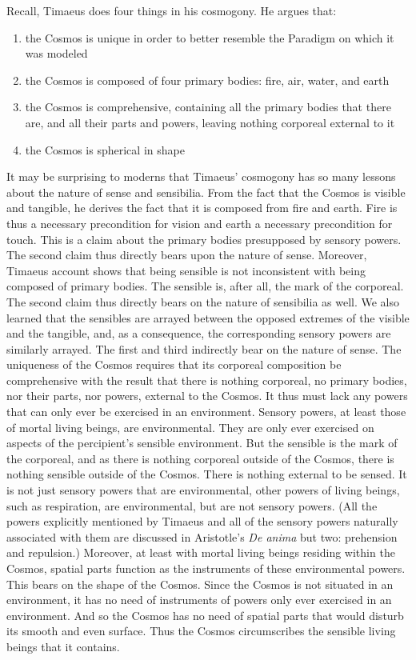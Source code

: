 Recall, Timaeus does four things in his cosmogony. He argues that:
\begin{enumerate}[(1)]
	\item the Cosmos is unique in order to better resemble the Paradigm on which it was modeled
	\item the Cosmos is composed of four primary bodies: fire, air, water, and earth
	\item the Cosmos is comprehensive, containing all the primary bodies that there are, and all their parts and powers, leaving nothing corporeal external to it
	\item the Cosmos is spherical in shape
\end{enumerate}
It may be surprising to moderns that Timaeus' cosmogony has so many lessons about the nature of sense and sensibilia. From the fact that the Cosmos is visible and tangible, he derives the fact that it is composed from fire and earth. Fire is thus a necessary precondition for vision and earth a necessary precondition for touch. This is a claim about the primary bodies presupposed by sensory powers. The second claim thus  directly bears upon the nature of sense. Moreover, Timaeus account shows that being sensible is not inconsistent with being composed of primary bodies. The sensible is, after all, the mark of the corporeal. The second claim thus directly bears on the nature of sensibilia as well. We also learned that the sensibles are arrayed between the opposed extremes of the visible and the tangible, and, as a consequence, the corresponding sensory powers are similarly arrayed. The first and third indirectly bear on the nature of sense. The uniqueness of the Cosmos requires that its corporeal composition be comprehensive with the result that there is nothing corporeal, no primary bodies, nor their parts, nor powers, external to the Cosmos. It thus must lack any powers that can only ever be exercised in an environment. Sensory powers, at least those of mortal living beings, are environmental. They are only ever exercised on aspects of the percipient's sensible environment. But the sensible is the mark of the corporeal, and as there is nothing corporeal outside of the Cosmos, there is nothing sensible outside of the Cosmos. There is nothing external to be sensed. It is not just sensory powers that are environmental, other powers of living beings, such as respiration, are environmental, but are not sensory powers. (All the powers explicitly mentioned by Timaeus and all of the sensory powers naturally associated with them are discussed in Aristotle's \emph{De anima} but two: prehension and repulsion.) Moreover, at least with mortal living beings residing within the Cosmos, spatial parts function as the instruments of these environmental powers. This bears on the shape of the Cosmos. Since the Cosmos is not situated in an environment, it has no need of instruments of powers only ever exercised in an environment. And so the Cosmos has no need of spatial parts that would disturb its smooth and even surface. Thus the Cosmos circumscribes the sensible living beings that it contains.



